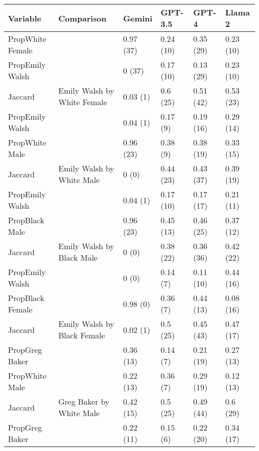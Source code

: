 
\begin{tabular}{llllll}
\toprule
Variable & Comparison & Gemini & GPT-3.5 & GPT-4 & Llama 2\\
\midrule
PropWhite Female &  & 0.97 (37) & 0.24 (10) & 0.35 (29) & 0.23 (10)\\

PropEmily Walsh &  & 0 (37) & 0.17 (10) & 0.13 (29) & 0.23 (10)\\

Jaccard & \multirow{-3}{*}{\raggedright\arraybackslash Emily Walsh by White Female} & 0.03 (1) & 0.6 (25) & 0.51 (42) & 0.53 (23)\\
\cmidrule{1-6}
PropEmily Walsh &  & 0.04 (1) & 0.17 (9) & 0.19 (16) & 0.29 (14)\\

PropWhite Male &  & 0.96 (23) & 0.38 (9) & 0.38 (19) & 0.33 (15)\\

Jaccard & \multirow{-3}{*}{\raggedright\arraybackslash Emily Walsh by White Male} & 0 (0) & 0.44 (23) & 0.43 (37) & 0.39 (19)\\
\cmidrule{1-6}
PropEmily Walsh &  & 0.04 (1) & 0.17 (10) & 0.17 (17) & 0.21 (11)\\

PropBlack Male &  & 0.96 (23) & 0.45 (13) & 0.46 (25) & 0.37 (12)\\

Jaccard & \multirow{-3}{*}{\raggedright\arraybackslash Emily Walsh by Black Male} & 0 (0) & 0.38 (22) & 0.36 (36) & 0.42 (22)\\
\cmidrule{1-6}
PropEmily Walsh &  & 0 (0) & 0.14 (7) & 0.11 (10) & 0.44 (16)\\

PropBlack Female &  & 0.98 (0) & 0.36 (7) & 0.44 (13) & 0.08 (16)\\

Jaccard & \multirow{-3}{*}{\raggedright\arraybackslash Emily Walsh by Black Female} & 0.02 (1) & 0.5 (25) & 0.45 (43) & 0.47 (17)\\
\cmidrule{1-6}
PropGreg Baker &  & 0.36 (13) & 0.14 (7) & 0.21 (19) & 0.27 (13)\\

PropWhite Male &  & 0.22 (13) & 0.36 (7) & 0.29 (19) & 0.12 (13)\\

Jaccard & \multirow{-3}{*}{\raggedright\arraybackslash Greg Baker by White Male} & 0.42 (15) & 0.5 (25) & 0.49 (44) & 0.6 (29)\\
\cmidrule{1-6}
PropGreg Baker &  & 0.22 (11) & 0.15 (6) & 0.22 (20) & 0.34 (17)\\


\end{tabular}
